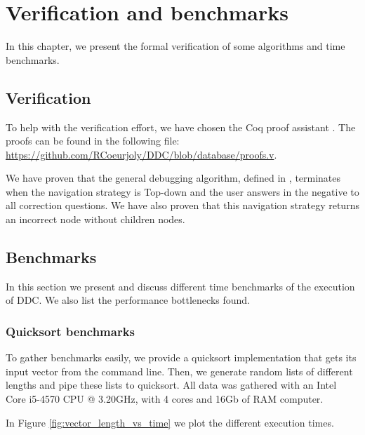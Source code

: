 \chapter{Verification and benchmarks}
\label{cap:verificationAndTesting}

In this chapter, we present the formal verification of some algorithms and time benchmarks.

\section{Verification}
To help with the verification effort, we have chosen the Coq proof assistant \cite{coq}. The proofs can be found in the following file:  \url{https://github.com/RCoeurjoly/DDC/blob/database/proofs.v}.

We have proven that the general debugging algorithm, defined in \cite{optimal_strategy}, terminates when the navigation strategy is Top-down and the user answers in the negative to all correction questions. We have also proven that this navigation strategy returns an incorrect node without children nodes.


\section{Benchmarks}
In this section we present and discuss different time benchmarks of the execution of DDC. We also list the performance bottlenecks found.

\subsection{Quicksort benchmarks}
To gather benchmarks easily, we provide a quicksort implementation that gets its input vector from the command line.
Then, we generate random lists of different lengths and pipe these lists to quicksort. All data was gathered with an Intel Core i5-4570 CPU @ 3.20GHz, with 4 cores and 16Gb of RAM computer.

In Figure \ref{fig:vector_length_vs_time} we plot the different execution times.

